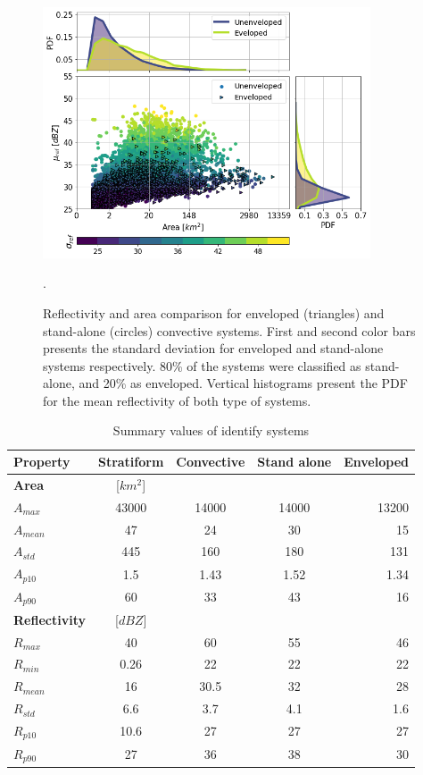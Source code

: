 \documentclass[preprint,12pt]{elsarticle}
\begin{document}
\begin{figure}[!h]
\centering
    \includegraphics[width=9.7cm]{Figuras/Area_vs_Ref_Conv_In_Out.png}
    \caption{Reflectivity and area comparison for enveloped (triangles) and stand-alone (circles) convective systems. First and second color bars presents the standard deviation for enveloped and stand-alone systems respectively. 80\% of the systems were classified as stand-alone, and 20\% as enveloped.  Vertical histograms present the PDF for the mean reflectivity of both type of systems.}.
    \label{fig:ConvectiveInOutAreaVsRef}
\end{figure}

\begin{table}[t]
\centering
\caption{Summary values of identify systems}
\begin{tabular}{lcccr}
\hline
  \textbf{Property} & \textbf{Stratiform} & \textbf{Convective} & \textbf{Stand alone} & \textbf{Enveloped} \\
\hline
    \textbf{Area} & [$km^2$] & &  \\
    $A_{max}$  & 43000 & 14000 & 14000 & 13200 \\ 
    $A_{mean}$ & 47 & 24 & 30 & 15 \\ 
    $A_{std}$ & 445 & 160 & 180 & 131 \\
    $A_{p10}$ & 1.5 & 1.43 & 1.52 & 1.34 \\
    $A_{p90}$ & 60 & 33 & 43 & 16 \\
\hline
    \textbf{Reflectivity} & [$dBZ$] & & \\
    $R_{max}$ & 40 & 60 & 55 & 46 \\
    $R_{min}$ & 0.26 & 22 & 22 & 22 \\
    $R_{mean}$ & 16 & 30.5 & 32 & 28 \\
    $R_{std}$ & 6.6 & 3.7 & 4.1 & 1.6 \\
    $R_{p10}$ & 10.6 & 27 & 27 & 27 \\
    $R_{p90}$ & 27 & 36 & 38 & 30 \\
\hline
\end{tabular}
\label{tab:summary}
\end{table}
\end{document}
